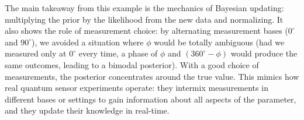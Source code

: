 The main takeaway from this example is the mechanics of Bayesian
updating: multiplying the prior by the likelihood from the new data
and normalizing. It also shows the role of measurement choice: by
alternating measurement bases ($0^\circ$ and $90^\circ$), we avoided a
situation where $\phi$ would be totally ambiguous (had we measured
only at $0^\circ$ every time, a phase of $\phi$ and $(360^\circ-\phi)$
would produce the same outcomes, leading to a bimodal posterior). With
a good choice of measurements, the posterior concentrates around the
true value. This mimics how real quantum sensor experiments operate:
they intermix measurements in different bases or settings to gain
information about all aspects of the parameter, and they update their
knowledge in real-time.



